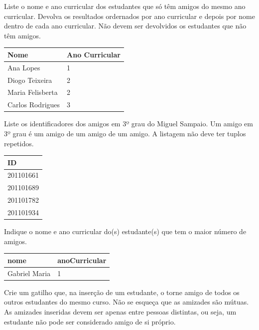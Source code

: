 \documentclass[type=normal, year=2015/16]{bdad_exam}
\begin{document}
{
Liste o nome e ano curricular dos estudantes que só têm amigos do mesmo ano curricular. Devolva os resultados ordernados por ano curricular e depois por nome dentro de cada ano curricular. Não devem ser devolvidos os estudantes que não têm amigos.
\begin{center} \begin{tabular}{l | l}
    \textbf{Nome}    & \textbf{Ano Curricular} \\ \hline
    Ana Lopes        & 1                       \\
    Diogo Teixeira   & 2                       \\
    Maria Felisberta & 2                       \\
    Carlos Rodrigues & 3
\end{tabular} \end{center}


Liste os identificadores dos amigos em 3º grau do Miguel Sampaio. Um amigo em 3º grau é um amigo de um amigo de um amigo. A listagem não deve ter tuplos repetidos.
\begin{center} \begin{tabular}{l}
    \textbf{ID} \\ \hline
    201101661   \\
    201101689   \\
    201101782   \\
    201101934 
\end{tabular} \end{center}


Indique o nome e ano curricular do(s) estudante(s) que tem o maior número de amigos.
\begin{center} \begin{tabular}{l | l}
    \textbf{nome} & \textbf{anoCurricular} \\ \hline
    Gabriel Maria & 1
\end{tabular} \end{center}


Crie um gatilho que, na inserção de um estudante, o torne amigo de todos os outros estudantes do mesmo curso. Não se esqueça que as amizades são mútuas. As amizades inseridas devem ser apenas entre pessoas distintas, ou seja, um estudante não pode ser considerado amigo de si próprio.


}
\end{document}
